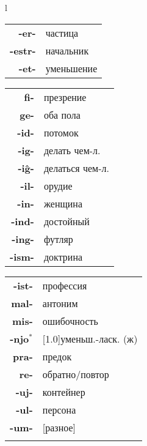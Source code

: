 \documentclass{article}
\begin{document}
\begin{center}
\begin{tabular}{l}
\begin{tabular}{>{\bfseries}rl}
-er- & частица \\
-estr- & начальник \\
-et- & уменьшение \\
\end{tabular}
\hspace{-1em}
\begin{tabular}{>{\bfseries}rl}
fi- & презрение \\
ge- & оба пола \\
-id- & потомок \\
-ig- & делать чем-л. \\
-iĝ- & делаться чем-л. \\
-il- & орудие \\
-in- & женщина \\
-ind- & достойный \\
-ing- & футляр \\
-ism- & доктрина \\
\end{tabular}
\hspace{-1em}
\begin{tabular}{>{\bfseries}rl}
-ist- & профессия \\
mal- & антоним \\
mis- & ошибочность \\
-njo$^*$ & \scalebox{.75}[1.0]{уменьш.-ласк. (ж)} \\
pra- & предок \\
re- & обратно/повтор \\
-uj- & контейнер \\
-ul- & персона \\
-um- & [разное] \\
\multicolumn{2}{r}{$^*$\em{к сокращ. корню}} \\
\end{tabular}
\vspace{0.5em}\\


\end{tabular}
\end{center}
\end{document}
